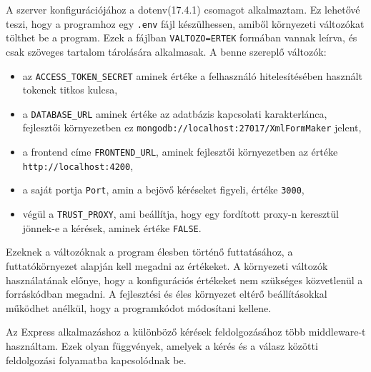 
A szerver konfigurációjához a dotenv(17.4.1) csomagot alkalmaztam. Ez lehetővé teszi, hogy a programhoz egy \texttt{.env} fájl készülhessen, amiből környezeti változókat tölthet be a program. Ezek a fájlban \texttt{VALTOZO=ERTEK} formában vannak leírva, és csak szöveges tartalom tárolására alkalmasak. A benne szereplő változók:
\begin{itemize}
\item az \texttt{ACCESS\_TOKEN\_SECRET} aminek értéke a felhasználó hitelesítésében használt tokenek titkos kulcsa,
\item a \texttt{DATABASE\_URL} aminek értéke az adatbázis kapcsolati karakterlánca, fejlesztői környezetben ez \texttt{mongodb://localhost:27017/XmlFormMaker} jelent,
\item a frontend címe \texttt{FRONTEND\_URL}, aminek fejlesztői környezetben az értéke \\ \texttt{http://localhost:4200},
\item a saját portja \texttt{Port}, amin a bejövő kéréseket figyeli, értéke \texttt{3000},
\item végül a \texttt{TRUST\_PROXY}, ami beállítja, hogy egy fordított proxy-n keresztül jönnek-e a kérések, aminek értéke \texttt{FALSE}.
\end{itemize} 
Ezeknek a változóknak a program élesben történő futtatásához, a futtatókörnyezet alapján kell megadni az értékeket. A környezeti változók használatának előnye, hogy a konfigurációs értékeket nem szükséges közvetlenül a forráskódban megadni. A fejlesztési és éles környezet eltérő beállításokkal működhet anélkül, hogy a programkódot módosítani kellene.

Az Express alkalmazáshoz a különböző kérések feldolgozásához több middleware-t használtam. Ezek olyan függvények, amelyek a kérés és a válasz közötti feldolgozási folyamatba kapcsolódnak be.

